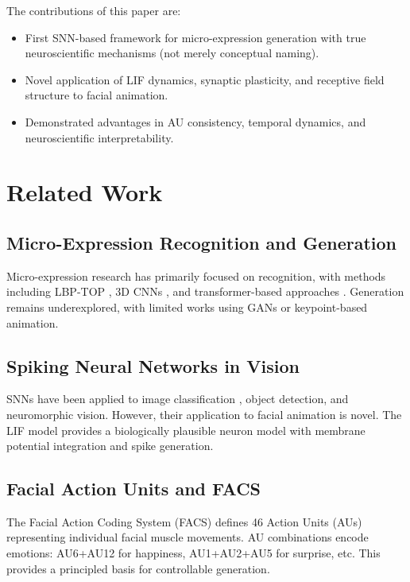 \documentclass[preprint,12pt]{elsarticle}
\begin{document}
The contributions of this paper are:
\begin{itemize}
\item First SNN-based framework for micro-expression generation with true
      neuroscientific mechanisms (not merely conceptual naming).
\item Novel application of LIF dynamics, synaptic plasticity, and receptive
      field structure to facial animation.
\item Demonstrated advantages in AU consistency, temporal dynamics, and
      neuroscientific interpretability.
\end{itemize}

\section{Related Work}
\label{sec:related}

\subsection{Micro-Expression Recognition and Generation}

Micro-expression research has primarily focused on recognition, with methods
including LBP-TOP \cite{zhao2007}, 3D CNNs \cite{3dcnn}, and transformer-based
approaches \cite{meformer}. Generation remains underexplored, with limited
works using GANs or keypoint-based animation.

\subsection{Spiking Neural Networks in Vision}

SNNs have been applied to image classification \cite{snnvision}, object detection,
and neuromorphic vision. However, their application to facial animation is novel.
The LIF model \cite{gerstner2014} provides a biologically plausible neuron model
with membrane potential integration and spike generation.

\subsection{Facial Action Units and FACS}

The Facial Action Coding System (FACS) \cite{ekman1978} defines 46 Action Units
(AUs) representing individual facial muscle movements. AU combinations encode
emotions: AU6+AU12 for happiness, AU1+AU2+AU5 for surprise, etc. This provides
a principled basis for controllable generation.
\end{document}
